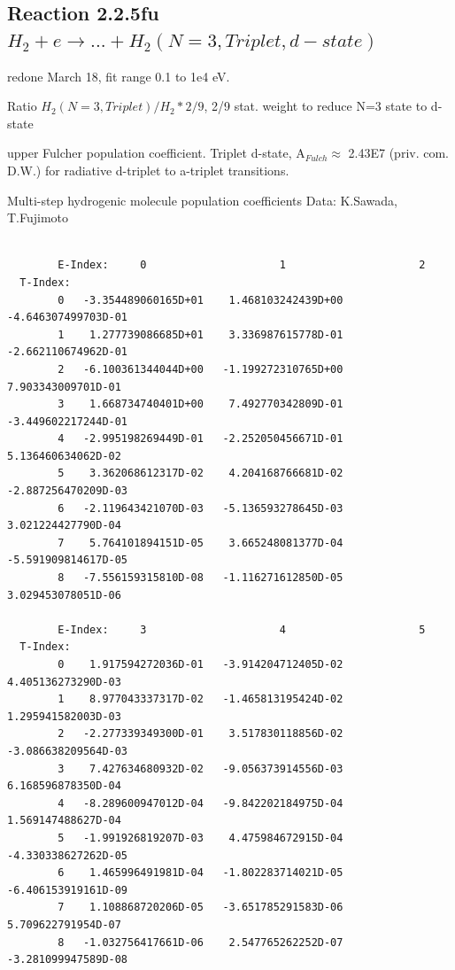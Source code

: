 \documentclass[12pt,dvipdfmx]{article}
\begin{document}
\subsection{
Reaction 2.2.5fu $H_2 + e \rightarrow ...+ H_2(N=3,Triplet, d-state)$}
redone March 18, fit range 0.1 to 1e4 eV.

Ratio $H_2(N=3, Triplet)/H_2*2/9 $,  2/9 stat. weight to reduce N=3 state to d-state

upper Fulcher population coefficient. Triplet d-state, A$_{Fulch} \approx $ 2.43E7  (priv. com. D.W.)
for radiative d-triplet to a-triplet transitions.

 Multi-step hydrogenic molecule population coefficients
 Data: K.Sawada, T.Fujimoto \cite{kn:Sawada}
\begin{small}\begin{verbatim}

        E-Index:     0                     1                     2
  T-Index:
        0   -3.354489060165D+01    1.468103242439D+00   -4.646307499703D-01
        1    1.277739086685D+01    3.336987615778D-01   -2.662110674962D-01
        2   -6.100361344044D+00   -1.199272310765D+00    7.903343009701D-01
        3    1.668734740401D+00    7.492770342809D-01   -3.449602217244D-01
        4   -2.995198269449D-01   -2.252050456671D-01    5.136460634062D-02
        5    3.362068612317D-02    4.204168766681D-02   -2.887256470209D-03
        6   -2.119643421070D-03   -5.136593278645D-03    3.021224427790D-04
        7    5.764101894151D-05    3.665248081377D-04   -5.591909814617D-05
        8   -7.556159315810D-08   -1.116271612850D-05    3.029453078051D-06

        E-Index:     3                     4                     5
  T-Index:
        0    1.917594272036D-01   -3.914204712405D-02    4.405136273290D-03
        1    8.977043337317D-02   -1.465813195424D-02    1.295941582003D-03
        2   -2.277339349300D-01    3.517830118856D-02   -3.086638209564D-03
        3    7.427634680932D-02   -9.056373914556D-03    6.168596878350D-04
        4   -8.289600947012D-04   -9.842202184975D-04    1.569147488627D-04
        5   -1.991926819207D-03    4.475984672915D-04   -4.330338627262D-05
        6    1.465996491981D-04   -1.802283714021D-05   -6.406153919161D-09
        7    1.108868720206D-05   -3.651785291583D-06    5.709622791954D-07
        8   -1.032756417661D-06    2.547765262252D-07   -3.281099947589D-08


\end{verbatim}
\end{small}
\end{document}
